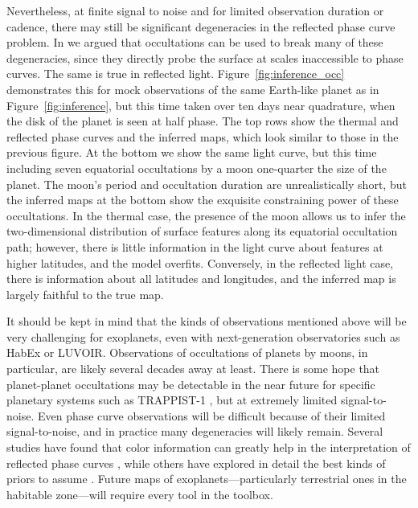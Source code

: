 \documentclass[modern]{aastex62}
\begin{document}
Nevertheless, at finite signal to noise and for limited observation
duration or cadence, there may still be significant degeneracies in
the reflected phase curve problem. In \citet{Luger2019} we argued that
occultations can be used to break many of these degeneracies, since they
directly probe the surface at scales inaccessible to phase curves.
The same is true in reflected light. Figure~\ref{fig:inference_occ}
demonstrates this for mock observations of the same Earth-like
planet as in Figure~\ref{fig:inference}, but this time taken
over ten days near quadrature, when the disk of the planet is seen at
half phase. The top rows show the thermal and reflected phase
curves and the inferred maps, which look similar to those in
the previous figure.
At the bottom we show the same light curve, but this time including
seven equatorial occultations by a moon one-quarter the size of the planet.
The moon's period and occultation duration are unrealistically short, but
the inferred maps at the bottom show the exquisite constraining power of these
occultations.
In the thermal case, the presence of the moon allows us to infer the
two-dimensional distribution of surface features along its equatorial
occultation path; however, there is little information
in the light curve about features at higher latitudes, and the \starry model
overfits. Conversely, in the reflected light case, there is information
about all latitudes and longitudes, and the inferred map is
largely faithful to the true map.

It should be kept in mind that the kinds of observations
mentioned above will be very challenging for exoplanets, even with
next-generation observatories such as HabEx or LUVOIR. Observations of
occultations of planets by moons, in particular, are likely several decades
away at least. There is some hope that planet-planet occultations may
be detectable in the near future for specific planetary
systems such as TRAPPIST-1
\citep{Luger2019b}, but at extremely limited signal-to-noise.
Even phase curve observations will be difficult
because of their limited signal-to-noise, and in practice many
degeneracies will likely remain. Several studies have found
that color information can greatly help in the interpretation of
reflected phase curves \citep{Cowan2009,Kawahara2011,LustigYaeger2018,Kawahara2020}, while others
have explored in detail the best kinds of priors to assume
\citep[e.g.,][]{Aizawa2020}. Future maps of exoplanets---particularly
terrestrial ones in the habitable zone---will require every tool
in the toolbox.
\end{document}
